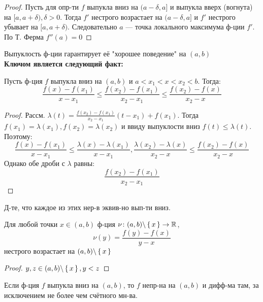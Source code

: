 \begin{proof}
  Пусть для опр-ти $f$ выпукла вниз на $(a - \delta, a]$ и выпукла вверх (вогнута) на $[a, a + \delta), \delta > 0$. Тогда $f'$ нестрого возрастает на $(a - \delta, a]$ и $f'$ нестрого убывает на $[a, a + \delta)$. Следовательно $a$ --- точка локального максимума ф-ции $f'$. По Т. Ферма $f''(a) = 0$
\end{proof}
Выпуклость ф-ции гарантирует её "хорошее поведение" на $(a, b)$ \\
\textbf{Ключом является следующий факт:}
\begin{lemma}
  \label{lm:3hord}
  Пусть ф-ция $f$ выпукла вниз на $(a, b)$ и $a < x_1 < x < x_2 < b$. Тогда:
  \begin{equation}
    \label{*}
    \frac{f(x) - f(x_1)}{x - x_1} \leq \frac{f(x_2) - f(x_1)}{x_2 - x_1} \leq \frac{f(x_2) - f(x)}{x_2 - x}
  \end{equation}
\end{lemma}
\begin{proof}
Рассм. $\lambda(t) = \frac{f(x_2) - f(x_1)}{x_2 - x_1}(t - x_1) + f(x_1)$. Тогда $f(x_1) = \lambda(x_1), f(x_2) = \lambda(x_2)$ и ввиду выпуклости вниз $f(t) \leq \lambda(t)$. Поэтому:
\[
  \frac{f(x) - f(x_1)}{x - x_1} \leq \frac{\lambda(x) - \lambda(x_1)}{x - x_1}, \frac{\lambda(x_2) - \lambda(x)}{x_2 - x} \leq \frac{f(x_2) - f(x)}{x_2 - x}
\]
Однако обе дроби с $\lambda$ равны:
\[
  \frac{f(x_2) - f(x_1)}{x_2 - x_1}
\]
\end{proof}
\begin{task}
Д-те, что каждое из этих нер-в эквив-но вып-ти вниз.
\end{task}
\begin{consequence}
  \label{monot:vip}
Для любой точки $x \in (a, b)$ ф-ция $\nu \colon (a, b) \backslash \set{x} \rightarrow \mathbb{R}$,
\[
\nu(y) = \frac{f(y) - f(x)}{y - x}
\]
нестрого возрастает на $(a, b) \backslash \set{x}$
\end{consequence}
\begin{proof}
$y, z \in (a, b) \backslash \set{x}, y < z$
\end{proof}
\begin{theorem}
\label{17s}
Если ф-ция $f$ выпукла вниз на $(a, b)$, то $f$ непр-на на $(a, b)$ и дифф-ма там, за исключением не более чем счётного мн-ва.
\end{theorem}
